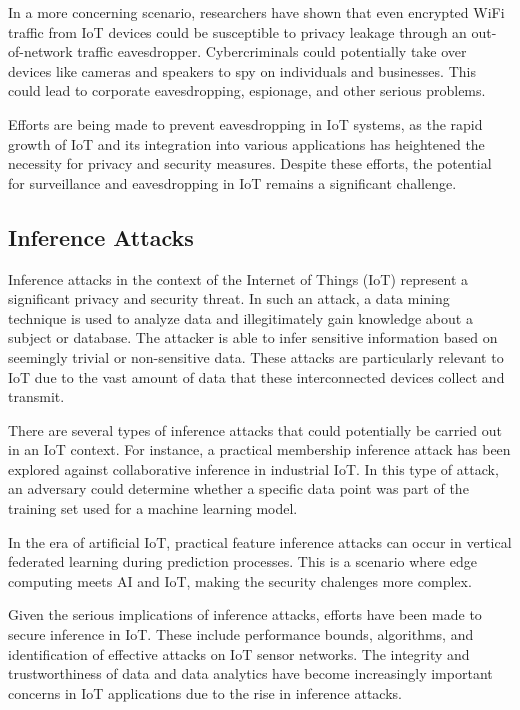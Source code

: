 In a more concerning scenario, researchers have shown that even encrypted WiFi traffic from IoT devices could be susceptible to privacy leakage through an out-of-network traffic eavesdropper\cite{alyami2022wifi}. Cybercriminals could potentially take over devices like cameras and speakers to spy on individuals and businesses. This could lead to corporate eavesdropping, espionage, and other serious problems\cite{em3602023}.

Efforts are being made to prevent eavesdropping in IoT systems, as the rapid growth of IoT and its integration into various applications has heightened the necessity for privacy and security measures\cite{liao2018eavesdropping}. Despite these efforts, the potential for surveillance and eavesdropping in IoT remains a significant challenge.

\subsection{Inference Attacks}
Inference attacks in the context of the Internet of Things (IoT) represent a significant privacy and security threat. In such an attack, a data mining technique is used to analyze data and illegitimately gain knowledge about a subject or database. The attacker is able to infer sensitive information based on seemingly trivial or non-sensitive data. These attacks are particularly relevant to IoT due to the vast amount of data that these interconnected devices collect and transmit.

There are several types of inference attacks that could potentially be carried out in an IoT context. For instance, a practical membership inference attack has been explored against collaborative inference in industrial IoT\cite{chen2020practical}. In this type of attack, an adversary could determine whether a specific data point was part of the training set used for a machine learning model.

In the era of artificial IoT, practical feature inference attacks can occur in vertical federated learning during prediction processes\cite{yang2023practical}. This is a scenario where edge computing meets AI and IoT, making the security chalenges more complex.

Given the serious implications of inference attacks, efforts have been made to secure inference in IoT. These include performance bounds, algorithms, and identification of effective attacks on IoT sensor networks\cite{zhang2018approaches}. The integrity and trustworthiness of data and data analytics have become increasingly important concerns in IoT applications due to the rise in inference attacks.
